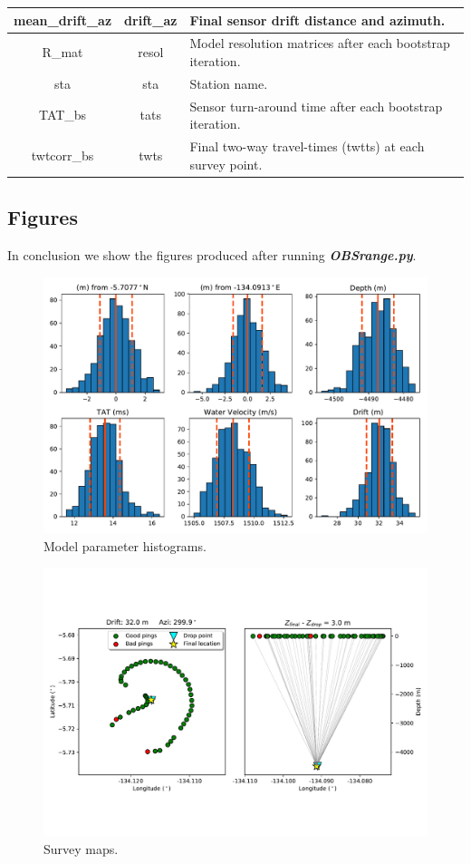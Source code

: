 \documentclass[titlepage, 12pt]{article}
\begin{document}
\begin{table}[h!]
\begin{tabularx}{\linewidth}{|c|c|X|}
    mean\_drift\_az & drift\_az  & Final sensor drift distance and azimuth. \\ \hline
    R\_mat          & resol      & Model resolution matrices after each bootstrap iteration. \\ \hline
    sta             & sta        & Station name. \\ \hline
    TAT\_bs         & tats       & Sensor turn-around time after each bootstrap iteration. \\ \hline
    twtcorr\_bs     & twts       & Final two-way travel-times (twtts) at each survey point. \\ \hline
    \end{tabularx}
   \end{table}
  

  \subsection{Figures}
  In conclusion we show the figures produced after running \textit{\textbf{OBSrange.py}}.

  \begin{figure}[!htb]
   \centering
   \includegraphics[width=0.8\linewidth]{histograms.pdf}
   \caption{Model parameter histograms.}
  \end{figure}

  \begin{figure}[!htb]
   \centering
   \includegraphics[width=0.9\linewidth]{maps.pdf}
   \caption{Survey maps.}
  \end{figure}
 
\end{document}
